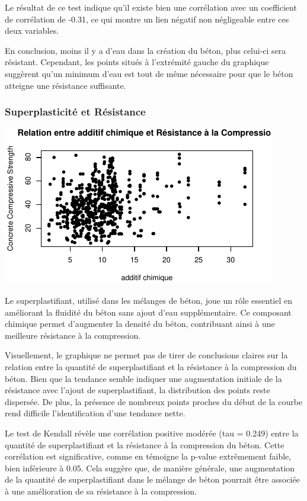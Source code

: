 \documentclass[
  12pt,
]{article}
\begin{document}
Le résultat de ce test indique qu'il existe bien une corrélation avec un
coefficient de corrélation de -0.31, ce qui montre un lien négatif non
négligeable entre ces deux variables.

En conclusion, moins il y a d'eau dans la création du béton, plus
celui-ci sera résistant. Cependant, les points situés à l'extrémité
gauche du graphique suggèrent qu'un minimum d'eau est tout de même
nécessaire pour que le béton atteigne une résistance suffisante.

\subsubsection{Superplasticité et
Résistance}\label{superplasticituxe9-et-ruxe9sistance}

\begin{center}\includegraphics{rmd_final_files/figure-latex/unnamed-chunk-20-1} \end{center}

Le superplastifiant, utilisé dans les mélanges de béton, joue un rôle
essentiel en améliorant la fluidité du béton sans ajout d'eau
supplémentaire. Ce composant chimique permet d'augmenter la densité du
béton, contribuant ainsi à une meilleure résistance à la compression.

Visuellement, le graphique ne permet pas de tirer de conclusions claires
sur la relation entre la quantité de superplastifiant et la résistance à
la compression du béton. Bien que la tendance semble indiquer une
augmentation initiale de la résistance avec l'ajout de superplastifiant,
la distribution des points reste dispersée. De plus, la présence de
nombreux points proches du début de la courbe rend difficile
l'identification d'une tendance nette.

Le test de Kendall révèle une corrélation positive modérée (tau = 0.249)
entre la quantité de superplastifiant et la résistance à la compression
du béton. Cette corrélation est significative, comme en témoigne la
p-value extrêmement faible, bien inférieure à 0.05. Cela suggère que, de
manière générale, une augmentation de la quantité de superplastifiant
dans le mélange de béton pourrait être associée à une amélioration de sa
résistance à la compression.
\end{document}
